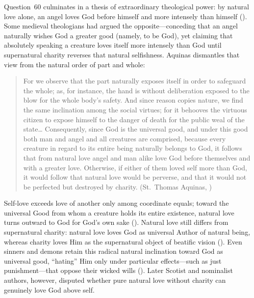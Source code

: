 Question~60 culminates in a thesis of extraordinary theological power: by natural love alone, an angel loves God before himself and more intensely than himself (). Some medieval theologians had argued the opposite---conceding that an angel naturally wishes God a greater good (namely, to be God), yet claiming that absolutely speaking a creature loves itself more intensely than God until supernatural charity reverses that natural selfishness. Aquinas dismantles that view from the natural order of part and whole:
\begin{quotation}
For we observe that the part naturally exposes itself in order to safeguard the whole; as, for instance, the hand is without deliberation exposed to the blow for the whole body's safety. And since reason copies nature, we find the same inclination among the social virtues; for it behooves the virtuous citizen to expose himself to the danger of death for the public weal of the state\dots{} Consequently, since God is the universal good, and under this good both man and angel and all creatures are comprised, because every creature in regard to its entire being naturally belongs to God, it follows that from natural love angel and man alike love God before themselves and with a greater love. Otherwise, if either of them loved self more than God, it would follow that natural love would be perverse, and that it would not be perfected but destroyed by charity. (St.~Thomas Aquinas, )
\end{quotation}
Self-love exceeds love of another only among coordinate equals; toward the universal Good from whom a creature holds its entire existence, natural love turns outward to God for God's own sake (). Natural love still differs from supernatural charity: natural love loves God as universal Author of natural being, whereas charity loves Him as the supernatural object of beatific vision (). Even sinners and demons retain this radical natural inclination toward God as universal good, ``hating'' Him only under particular effects---such as just punishment---that oppose their wicked wills (). Later Scotist and nominalist authors, however, disputed whether pure natural love without charity can genuinely love God above self.


